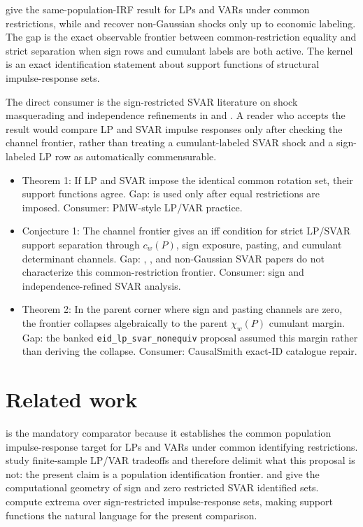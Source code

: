 \documentclass[11pt]{article}
\theoremstyle{definition}
\theoremstyle{plain}
\theoremstyle{remark}
\begin{document}
\citet[pp. 955--958 and Proposition 1]{plagborgmoller_wolf_2021_lp_var} give
the same-population-IRF result for LPs and VARs under common restrictions, while
\citet[Sections 3--4]{gourieroux_monfort_renne_2017_ica_svar} and
\citet[Sections 2--3]{lanne_meitz_saikkonen_2017_nongaussian_svar} recover
non-Gaussian shocks only up to economic labeling. The gap is the exact
observable frontier between common-restriction equality and strict separation
when sign rows and cumulant labels are both active. The kernel is an exact
identification statement about support functions of structural impulse-response
sets.

The direct consumer is the sign-restricted SVAR literature on shock masquerading
and independence refinements in \citet{wolf_2022_sign_restricted_vars} and
\citet{drautzburg_wright_2023_independence}. A reader who accepts the result
would compare LP and SVAR impulse responses only after checking the channel
frontier, rather than treating a cumulant-labeled SVAR shock and a sign-labeled
LP row as automatically commensurable.

\begin{itemize}[leftmargin=*]
\item Theorem 1: If LP and SVAR impose the identical common rotation set, their support functions agree. Gap: \citet{plagborgmoller_wolf_2021_lp_var} is used only after equal restrictions are imposed. Consumer: PMW-style LP/VAR practice.
\item Conjecture 1: The channel frontier gives an iff condition for strict LP/SVAR support separation through \(c_w(P)\), sign exposure, pasting, and cumulant determinant channels. Gap: \citet{read_2022_sign_zero_algorithms}, \citet{drautzburg_wright_2023_independence}, and non-Gaussian SVAR papers do not characterize this common-restriction frontier. Consumer: sign and independence-refined SVAR analysis.
\item Theorem 2: In the parent corner where sign and pasting channels are zero, the frontier collapses algebraically to the parent \(\chi_w(P)\) cumulant margin. Gap: the banked \texttt{eid\_lp\_svar\_nonequiv} proposal assumed this margin rather than deriving the collapse. Consumer: CausalSmith exact-ID catalogue repair.
\end{itemize}

\section{Related work}
\citet{plagborgmoller_wolf_2021_lp_var} is the mandatory comparator because it
establishes the common population impulse-response target for LPs and VARs under
common identifying restrictions. \citet{li_plagborgmoller_wolf_2024_varlp} study
finite-sample LP/VAR tradeoffs and therefore delimit what this proposal is not:
the present claim is a population identification frontier. \citet{arias_rubioramirez_waggoner_2018_signzero}
and \citet{read_2022_sign_zero_algorithms} give the computational geometry of
sign and zero restricted SVAR identified sets. \citet{gafarov_meier_montielolea_2018_svar}
compute extrema over sign-restricted impulse-response sets, making support
functions the natural language for the present comparison.
\end{document}
